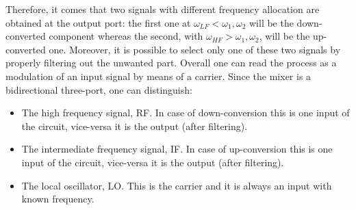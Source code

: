 Therefore, it comes that two signals with different frequency allocation are obtained at the output port: the first one at $\omega_{LF}<\omega_1,\omega_2$ will be the down-converted component whereas the second, with $\omega_{HF}>\omega_1,\omega_2$, will be the up-converted one.  Moreover, it is possible to select only one of these two signals by properly filtering out the unwanted part.
Overall one can read the process as a modulation of an input signal by means of a carrier.  Since the mixer is a bidirectional three-port, one can distinguish: 
\begin{itemize}
	\item The high frequency signal, RF. In case of down-conversion this is one input of the circuit, vice-versa it is the output (after filtering).
	\item The intermediate frequency signal, IF. In case of up-conversion this is one input of the circuit, vice-versa it is the output (after filtering).
	\item The local oscillator, LO. This is the carrier and it is always an input with known frequency.
\end{itemize}

